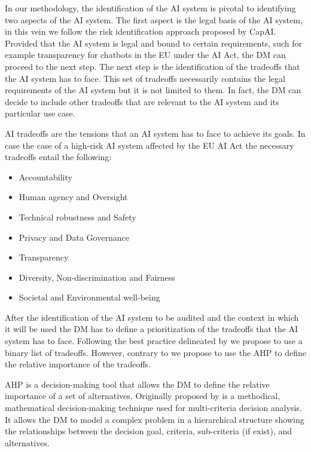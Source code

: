In our methodology, the identification of the AI system is pivotal to identifying two aspects of the AI system.
The first aspect is the legal basis of the AI system, in this vein we follow the risk identification approach proposed by CapAI.
Provided that the AI system is legal and bound to certain requirements, such for example transparency for chatbots in the EU under the AI Act, the DM can proceed to the next step.
The next step is the identification of the tradeoffs that the AI system has to face.
This set of tradeoffs necessarily contains the legal requirements of the AI system but it is not limited to them.
In fact, the DM can decide to include other tradeoffs that are relevant to the AI system and its particular use case.

AI tradeoffs are the tensions that an AI system has to face to achieve its goals.
In case the case of a high-risk AI system affected by the EU AI Act the necessary tradeoffs entail the following:

\begin{itemize}
    \item Accountability
    \item Human agency and Oversight
    \item Technical robustness and Safety
    \item Privacy and Data Governance 
    \item Transparency
    \item Diversity, Non-discrimination and Fairness
    \item Societal and Environmental well-being
\end{itemize}

After the identification of the AI system to be audited and the context in which it will be used the DM has to define a prioritization of the tradeoffs that the AI system has to face.
Following the best practice delineated by \cite{vetter_2023} we propose to use a binary list of tradeoffs.
However, contrary to \cite{vetter_2023} we propose to use the AHP to define the relative importance of the tradeoffs.

AHP is a decision-making tool that allows the DM to define the relative importance of a set of alternatives.
Originally proposed by \cite{saaty_1988} is a methodical, mathematical decision-making technique used for multi-criteria decision analysis.
It allows the DM to model a complex problem in a hierarchical structure showing the relationships between the decision goal, criteria, sub-criteria (if exist), and alternatives.

